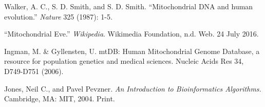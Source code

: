 \documentclass[conference]{IEEEtran}
\begin{document}
\begin{thebibliography}{1}

Walker, A. C., S. D. Smith, and S. D. Smith. \enquote{Mitochondrial DNA and human evolution.} \textit{Nature} 325 (1987): 1-5.

\enquote{Mitochondrial Eve.} \textit{Wikipedia}. Wikimedia Foundation, n.d. Web. 24 July 2016.

Ingman, M. \& Gyllensten, U. mtDB: Human Mitochondrial Genome Database, a resource for population genetics and medical sciences. Nucleic Acids Res 34, D749-D751 (2006).

Jones, Neil C., and Pavel Pevzner. \textit{An Introduction to Bioinformatics Algorithms.} Cambridge, MA: MIT, 2004. Print.
\end{thebibliography}
\end{document}
